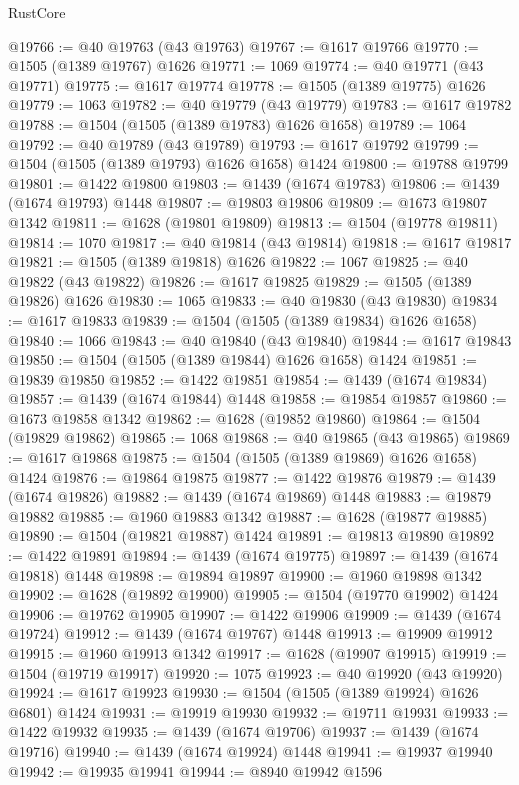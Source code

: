 \begin{lexlean}{RustCore}
\begin{coremodule}
@19766 := @40 @19763 (@43 @19763)
@19767 := @1617 @19766
@19770 := @1505 (@1389 @19767) @1626
@19771 := 1069
@19774 := @40 @19771 (@43 @19771)
@19775 := @1617 @19774
@19778 := @1505 (@1389 @19775) @1626
@19779 := 1063
@19782 := @40 @19779 (@43 @19779)
@19783 := @1617 @19782
@19788 := @1504 (@1505 (@1389 @19783) @1626 @1658)
@19789 := 1064
@19792 := @40 @19789 (@43 @19789)
@19793 := @1617 @19792
@19799 := @1504 (@1505 (@1389 @19793) @1626 @1658) @1424
@19800 := @19788 @19799
@19801 := @1422 @19800
@19803 := @1439 (@1674 @19783)
@19806 := @1439 (@1674 @19793) @1448
@19807 := @19803 @19806
@19809 := @1673 @19807 @1342
@19811 := @1628 (@19801 @19809)
@19813 := @1504 (@19778 @19811)
@19814 := 1070
@19817 := @40 @19814 (@43 @19814)
@19818 := @1617 @19817
@19821 := @1505 (@1389 @19818) @1626
@19822 := 1067
@19825 := @40 @19822 (@43 @19822)
@19826 := @1617 @19825
@19829 := @1505 (@1389 @19826) @1626
@19830 := 1065
@19833 := @40 @19830 (@43 @19830)
@19834 := @1617 @19833
@19839 := @1504 (@1505 (@1389 @19834) @1626 @1658)
@19840 := 1066
@19843 := @40 @19840 (@43 @19840)
@19844 := @1617 @19843
@19850 := @1504 (@1505 (@1389 @19844) @1626 @1658) @1424
@19851 := @19839 @19850
@19852 := @1422 @19851
@19854 := @1439 (@1674 @19834)
@19857 := @1439 (@1674 @19844) @1448
@19858 := @19854 @19857
@19860 := @1673 @19858 @1342
@19862 := @1628 (@19852 @19860)
@19864 := @1504 (@19829 @19862)
@19865 := 1068
@19868 := @40 @19865 (@43 @19865)
@19869 := @1617 @19868
@19875 := @1504 (@1505 (@1389 @19869) @1626 @1658) @1424
@19876 := @19864 @19875
@19877 := @1422 @19876
@19879 := @1439 (@1674 @19826)
@19882 := @1439 (@1674 @19869) @1448
@19883 := @19879 @19882
@19885 := @1960 @19883 @1342
@19887 := @1628 (@19877 @19885)
@19890 := @1504 (@19821 @19887) @1424
@19891 := @19813 @19890
@19892 := @1422 @19891
@19894 := @1439 (@1674 @19775)
@19897 := @1439 (@1674 @19818) @1448
@19898 := @19894 @19897
@19900 := @1960 @19898 @1342
@19902 := @1628 (@19892 @19900)
@19905 := @1504 (@19770 @19902) @1424
@19906 := @19762 @19905
@19907 := @1422 @19906
@19909 := @1439 (@1674 @19724)
@19912 := @1439 (@1674 @19767) @1448
@19913 := @19909 @19912
@19915 := @1960 @19913 @1342
@19917 := @1628 (@19907 @19915)
@19919 := @1504 (@19719 @19917)
@19920 := 1075
@19923 := @40 @19920 (@43 @19920)
@19924 := @1617 @19923
@19930 := @1504 (@1505 (@1389 @19924) @1626 @6801) @1424
@19931 := @19919 @19930
@19932 := @19711 @19931
@19933 := @1422 @19932
@19935 := @1439 (@1674 @19706)
@19937 := @1439 (@1674 @19716)
@19940 := @1439 (@1674 @19924) @1448
@19941 := @19937 @19940
@19942 := @19935 @19941
@19944 := @8940 @19942 @1596

\end{coremodule}
\end{lexlean}
